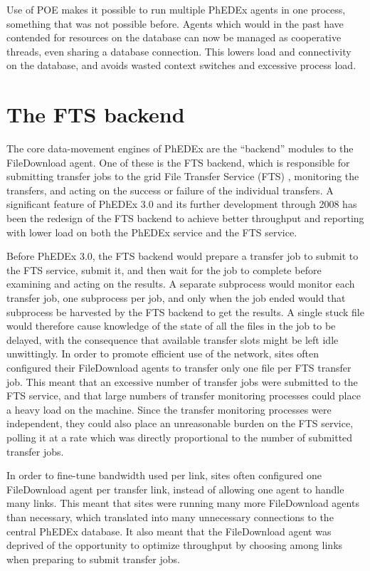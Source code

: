 \documentclass{PoS}
\begin{document}
Use of POE makes it possible to run multiple PhEDEx agents in one
process, something that was not possible before. Agents which would in
the past have contended for resources on the database can now be
managed as cooperative threads, even sharing a database
connection. This lowers load and connectivity on the database, and
avoids wasted context switches and excessive process load.

\section{The FTS backend}

The core data-movement engines of PhEDEx are the ``backend'' modules to
the FileDownload agent. One of these is the FTS backend, which is
responsible for submitting transfer jobs to the grid File Transfer
Service (FTS) \cite{fts}, monitoring the transfers, and acting on the
success or failure of the individual transfers. A significant feature
of PhEDEx 3.0 and its further development through 2008 has been the
redesign of the FTS backend to achieve better throughput and reporting
with lower load on both the PhEDEx service and the FTS service.

Before PhEDEx 3.0, the FTS backend would prepare a transfer job to
submit to the FTS service, submit it, and then wait for the job to complete
before examining and acting on the results. A separate subprocess
would monitor each transfer job, one subprocess per job, and only when
the job ended would that subprocess be harvested by the FTS backend to
get the results. A single stuck file would therefore cause knowledge
of the state of all the files in the job to be delayed, with the
consequence that available transfer slots might be left idle
unwittingly. In order to promote efficient use of the network, sites
often configured their FileDownload agents to transfer only one file
per FTS transfer job. This meant that an excessive number of
transfer jobs were submitted to the FTS service, and that large
numbers of transfer monitoring processes could place a heavy load on
the machine. Since the transfer monitoring processes were
independent, they could also place an unreasonable burden on the FTS
service, polling it at a rate which was directly proportional to the
number of submitted transfer jobs.

In order to fine-tune bandwidth used per link, sites often configured
one FileDownload agent per transfer link, instead of allowing one
agent to handle many links. This meant that sites were running many
more FileDownload agents than necessary, which translated into many
unnecessary connections to the central PhEDEx database. It also meant
that the FileDownload agent was deprived of the opportunity to
optimize throughput by choosing among links when preparing to submit
transfer jobs.
\end{document}
